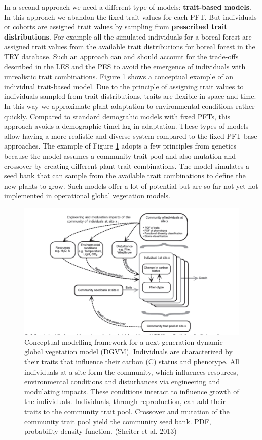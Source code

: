 \documentclass[12pt,oneside]{book}
\begin{document}
In a second approach we need a different type of models:
\textbf{trait-based models}. In this approach we abandon the fixed trait
values for each PFT. But individuals or cohorts are assigned trait
values by sampling from \textbf{prescribed trait distributions}. For
example all the simulated individuals for a boreal forest are assigned
trait values from the available trait distributions for boreal forest in
the TRY database. Such an approach can and should account for the
trade-offs described in the LES and the PES to avoid the emergence of
individuals with unrealistic trait combinations. Figure \ref{fig:f717}
shows a conceptual example of an individual trait-based model. Due to
the principle of assigning trait values to individuals sampled from
trait distributions, traits are flexible in space and time. In this way
we approximate plant adaptation to environmental conditions rather
quickly. Compared to standard demograhic models with fixed PFTs, this
approach avoids a demographic timel lag in adaptation. These types of
models allow having a more realistic and diverse system compared to the
fixed PFT-base approaches. The example of Figure \ref{fig:f717} adopts a
few principles from genetics because the model assumes a community trait
pool and also mutation and crossover by creating different plant trait
combinations. The model simulates a seed bank that can sample from the
available trait combinations to define the new plants to grow. Such
models offer a lot of potential but are so far not yet not implemented
in operational global vegetation models.

\begin{figure}

{\centering \includegraphics[width=0.8\linewidth]{figures/chap7/f717_aDGVM} 

}

\caption{Conceptual modelling framework for a next-generation dynamic global vegetation model (DGVM). Individuals are characterized by their traits that influence their carbon (C) status and phenotype. All individuals at a site form the community, which influences resources, environmental conditions and disturbances via engineering and modulating impacts. These conditions interact to influence growth of the individuals. Individuals, through reproduction, can add their traits to the community trait pool. Crossover and mutation of the community trait pool yield the community seed bank. PDF, probability density function. (Sheiter et al. 2013)}\label{fig:f717}
\end{figure}
\end{document}
